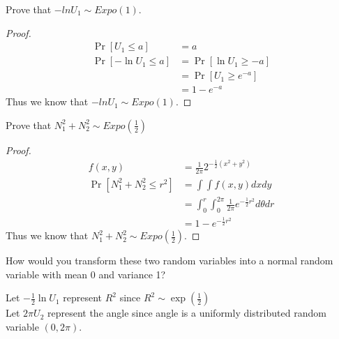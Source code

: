 \documentclass[11pt]{article}
\begin{document}
\newpage
{}

\begin{Parts}
    
    \Part Prove that $-ln U_1 \sim Expo(1)$.

    \begin{Answer}
        \begin{proof}
            \begin{align*}
                \Pr[U_1 \leq a]      &= a \\
                \Pr[-\ln U_1 \leq a] &= \Pr[\ln U_1 \geq -a] \\
                                     &= \Pr[U_1 \geq e^{-a}] \\
                                     &= 1 - e^{-a}
            \end{align*}
            Thus we know that $-ln U_1 \sim Expo(1)$.
        \end{proof}
    \end{Answer}

    \Part Prove that $N_1^2 + N_2^2 \sim Expo(\frac{1}{2})$

    \begin{Answer}
        \begin{proof}
            \begin{align*}
                f(x,y) &= \frac{1}{2\pi} 2^{-\frac{1}{2}(x^2+y^2)} \\
                \Pr[N_1^2 + N_2^2 \leq r^2] &= \int \int f(x,y) dx dy \\
                                            &= \int_0^r \int_0^{2\pi} \frac{1}{2\pi} e^{-\frac{1}{2}r^2} d\theta dr \\
                                            &= 1 - e^{-\frac{1}{2}r^2}
            \end{align*}
            Thus we know that $N_1^2 + N_2^2 \sim Expo(\frac{1}{2})$. 
        \end{proof}
    \end{Answer}

    \Part How would you transform these two random variables into a normal random variable with mean 0 and variance 1?

    \begin{Answer}
        Let $-\frac{1}{2} \ln U_1$ represent $R^2$ since $R^2 \sim \exp(\frac{1}{2})$ \\
        Let $2\pi U_2$ represent the angle since angle is a uniformly distributed random variable $(0, 2\pi)$.
    \end{Answer}

\end{Parts}
\end{document}
